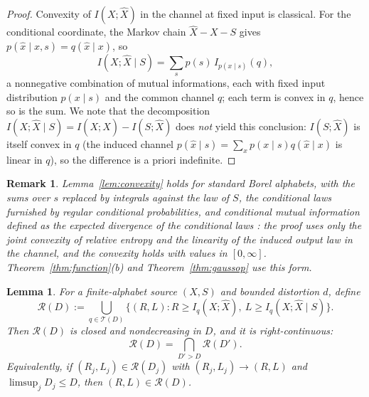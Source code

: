 \documentclass[11pt,onecolumn]{IEEEtran}
\newtheorem{lemma}[theorem]{Lemma}
\newtheorem{remark}[theorem]{Remark}
\newcommand{\hX}{\widehat{X}}
\begin{document}
\begin{proof}
Convexity of $I(X;\hX)$ in the channel at fixed input is classical. For the
conditional coordinate, the Markov chain $\hX-X-S$ gives
$p(\hat x\mid x,s)=q(\hat x\mid x)$, so
\begin{equation}
 I(X;\hX\mid S)=\sum_s p(s)\,I_{p(x\mid s)}(q),
 \label{eq:per-s-decomposition}
\end{equation}
a nonnegative combination of mutual informations, each with fixed input
distribution $p(x\mid s)$ and the common channel $q$; each term is convex in
$q$, hence so is the sum. We note that the decomposition
$I(X;\hX\mid S)=I(X;\hX)-I(S;\hX)$ does \emph{not} yield this conclusion:
$I(S;\hX)$ is itself convex in $q$ (the induced channel
$p(\hat x\mid s)=\sum_x p(x\mid s)q(\hat x\mid x)$ is linear in $q$), so the
difference is a priori indefinite.
\end{proof}

\begin{remark}\label{rem:convgeneral}
Lemma~\ref{lem:convexity} holds for standard Borel alphabets, with the
sums over $s$ replaced by integrals against the law of $S$, the
conditional laws furnished by regular conditional probabilities, and
conditional mutual information defined as the expected divergence of the
conditional laws \cite{wyner1978}: the proof uses only the joint
convexity of relative entropy \cite{csiszar1967} and the linearity of
the induced output law in the channel, and the convexity holds with
values in $[0,\infty]$. Theorem~\ref{thm:function}(b) and Theorem~\ref{thm:gaussop}
use this form.
\end{remark}

\begin{lemma}
\label{lem:rightcont}
For a finite-alphabet source $(X,S)$ and bounded distortion $d$, define
\[
\mathcal R(D):=\bigcup_{q\in\mathcal T(D)}
\bigl\{(R,L):R\ge I_q(X;\hX),\ L\ge I_q(X;\hX\mid S)\bigr\}.
\]
Then $\mathcal R(D)$ is closed and nondecreasing in $D$, and it is
right-continuous:
\[
\mathcal R(D)=\bigcap_{D'>D}\mathcal R(D').
\]
Equivalently, if $(R_j,L_j)\in\mathcal R(D_j)$ with
$(R_j,L_j)\to(R,L)$ and $\limsup_jD_j\le D$, then
$(R,L)\in\mathcal R(D)$.
\end{lemma}
\end{document}
